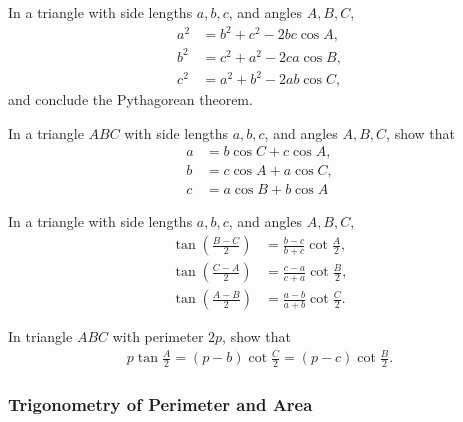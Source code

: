 \begin{tcolorbox}
    \begin{question}[name=Law of Cosines]
    In a triangle with side lengths $a,b,c$, and angles $A,B,C$,
    \begin{align*}
        a^2 &= b^2 + c^2 - 2bc\cos A,\\
        b^2 &= c^2 + a^2 - 2ca\cos B,\\
        c^2 &= a^2 + b^2 - 2ab\cos C,
    \end{align*}
    and conclude the Pythagorean theorem.
\end{question}
\end{tcolorbox}


\begin{question}[name=Projection Rule in Triangle]
In a triangle $ABC$ with side lengths $a,b,c$, and angles $A,B,C$, show that
    \begin{align*}
        a&=b\cos C + c\cos A,\\
        b&=c\cos A + a\cos C,\\
        c&=a\cos B + b\cos A
    \end{align*}
\end{question}


\begin{tcolorbox}
    \begin{question}[name=Law of Tangents]
    In a triangle with side lengths $a,b,c$, and angles $A,B,C$,
    \begin{align*}
        \tan\left(\frac{B-C}{2}\right) &= \frac{b-c}{b+c}\cot\frac{A}{2},\\
        \tan\left(\frac{C-A}{2}\right) &= \frac{c-a}{c+a}\cot\frac{B}{2},\\
        \tan\left(\frac{A-B}{2}\right) &= \frac{a-b}{a+b}\cot\frac{C}{2}.
    \end{align*}
\end{question}
\end{tcolorbox}

\begin{question}
In triangle $ABC$ with perimeter $2p$, show that
    \begin{align*}
        p\tan\frac{A}{2} = (p-b)\cot\frac{C}{2} = (p-c)\cot\frac{B}{2}.        
    \end{align*}
\end{question}

\subsubsection{Trigonometry of Perimeter and Area}




